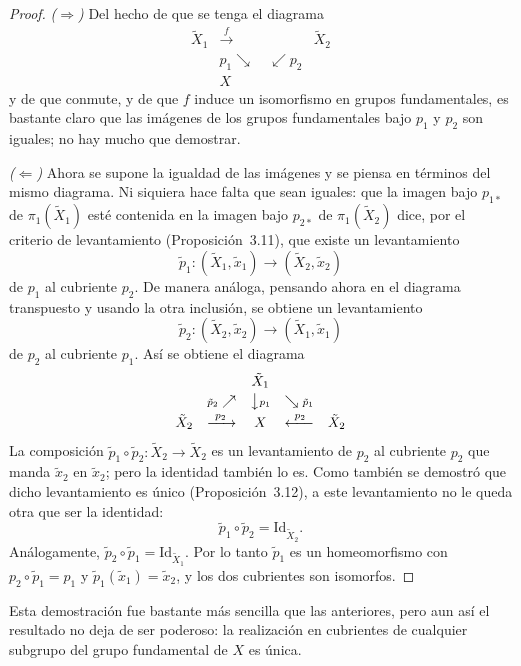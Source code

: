 \documentclass[11pt]{article}
\begin{document}
\begin{proof}
\emph{($\Rightarrow$)} Del hecho de que se tenga el diagrama
\[
  \begin{array}{ccc}
    \tilde X_1 & \xrightarrow{\ f\ } & \tilde X_2\\[2pt]
    & {\scriptstyle p_1}\searrow\quad\swarrow{\scriptstyle p_2} & \\[2pt]
    & X &
  \end{array}
\]
y de que conmute, y de que $f$ induce un isomorfismo en grupos fundamentales, es bastante claro que las imágenes de los grupos fundamentales bajo $p_1$ y $p_2$ son iguales; no hay mucho que demostrar.

\medskip\noindent\emph{($\Leftarrow$)} Ahora se supone la igualdad de las imágenes y se piensa en términos del mismo diagrama. Ni siquiera hace falta que sean iguales: que la imagen bajo $p_{1*}$ de $\pi_1(\tilde X_1)$ esté contenida en la imagen bajo $p_{2*}$ de $\pi_1(\tilde X_2)$ dice, por el criterio de levantamiento (Proposición~3.11), que existe un levantamiento
\[
  \tilde p_1\colon(\tilde X_1,\tilde x_1)\to(\tilde X_2,\tilde x_2)
\]
de $p_1$ al cubriente $p_2$. De manera análoga, pensando ahora en el diagrama transpuesto y usando la otra inclusión, se obtiene un levantamiento
\[
  \tilde p_2\colon(\tilde X_2,\tilde x_2)\to(\tilde X_1,\tilde x_1)
\]
de $p_2$ al cubriente $p_1$. Así se obtiene el diagrama
\[
  \begin{array}{ccccc}
    & & \tilde X_1 & & \\[2pt]
    & {\scriptstyle\tilde p_2}\nearrow & \big\downarrow{\scriptstyle p_1} & \searrow{\scriptstyle\tilde p_1} & \\[2pt]
    \tilde X_2 & \xrightarrow{\ p_2\ } & X & \xleftarrow{\ p_2\ } & \tilde X_2
  \end{array}
\]
La composición $\tilde p_1\circ\tilde p_2\colon\tilde X_2\to\tilde X_2$ es un levantamiento de $p_2$ al cubriente $p_2$ que manda $\tilde x_2$ en $\tilde x_2$; pero la identidad también lo es. Como también se demostró que dicho levantamiento es único (Proposición~3.12), a este levantamiento no le queda otra que ser la identidad:
\[
  \tilde p_1\circ\tilde p_2=\mathrm{Id}_{\tilde X_2}.
\]
Análogamente, $\tilde p_2\circ\tilde p_1=\mathrm{Id}_{\tilde X_1}$. Por lo tanto $\tilde p_1$ es un homeomorfismo con $p_2\circ\tilde p_1=p_1$ y $\tilde p_1(\tilde x_1)=\tilde x_2$, y los dos cubrientes son isomorfos.
\end{proof}

Esta demostración fue bastante más sencilla que las anteriores, pero aun así el resultado no deja de ser poderoso: la realización en cubrientes de cualquier subgrupo del grupo fundamental de $X$ es única.

\begin{erratas}
\end{erratas}
\end{document}

